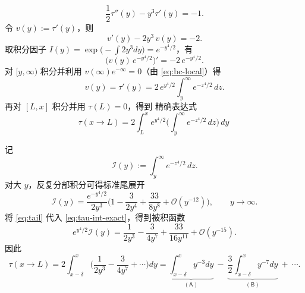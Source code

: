 \begin{equation}\label{eq:ode-cubic}
	\frac{1}{2}\tau''(y)-y^{3}\tau'(y)=-1.
\end{equation}
令 $v(y):=\tau'(y)$，则
\begin{equation}\label{eq:v-ode}
	v'(y)-2y^3\,v(y)=-2.
\end{equation}
取积分因子 $I(y)=\exp\!\big(-\int 2y^3dy\big)=e^{-y^4/2}$，有
\[
\big(v(y)\,e^{-y^4/2}\big)'=-2\,e^{-y^4/2}.
\]
对 \([y,\infty)\) 积分并利用 $v(\infty)e^{-\infty}=0$（由 \eqref{eq:bc-local}）得
\begin{equation}\label{eq:v-sol}
	v(y)=\tau'(y)=2\,e^{y^4/2}\int_{y}^{\infty}e^{-z^4/2}\,dz.
\end{equation}
再对 \([L,x]\) 积分并用 $\tau(L)=0$，得到 精确表达式
\begin{equation}\label{eq:tau-int-exact}
	\tau(x\to L)=2\int_{L}^{x} e^{y^{4}/2}
	\Big(\int_{y}^{\infty} e^{-z^{4}/2}\,dz\Big)\,dy\ 
\end{equation}

记
\[
\mathcal I(y):=\int_{y}^{\infty} e^{-z^{4}/2}\,dz.
\]
对大 $y$，反复分部积分可得标准尾展开
\begin{equation}\label{eq:tail}
	\mathcal I(y)=\frac{e^{-y^{4}/2}}{2y^{3}}
	\Big(1-\frac{3}{2y^{4}}+\frac{33}{8y^{8}}+\mathcal O(y^{-12})\Big),\qquad y\to\infty.
\end{equation}
将 \eqref{eq:tail} 代入 \eqref{eq:tau-int-exact}，得到被积函数
\begin{equation}\label{eq:F-expansion}
	e^{y^{4}/2}\mathcal I(y)
	=\frac{1}{2y^{3}}-\frac{3}{4y^{7}}+\frac{33}{16y^{11}}+\mathcal O(y^{-15}).
\end{equation}
因此
\begin{equation}\label{eq:tau-asym-start}
	\tau(x\to L)
	=2\!\int_{x-\delta}^{x}\!\!\Big(\frac{1}{2y^{3}}-\frac{3}{4y^{7}}+\cdots\Big)dy
	=\underbrace{\int_{x-\delta}^{x}\!y^{-3}dy}_{\mathsf{(A)}}
	\ -\ \underbrace{\frac{3}{2}\int_{x-\delta}^{x}\!y^{-7}dy}_{\mathsf{(B)}}
	\ +\ \cdots.
\end{equation}

